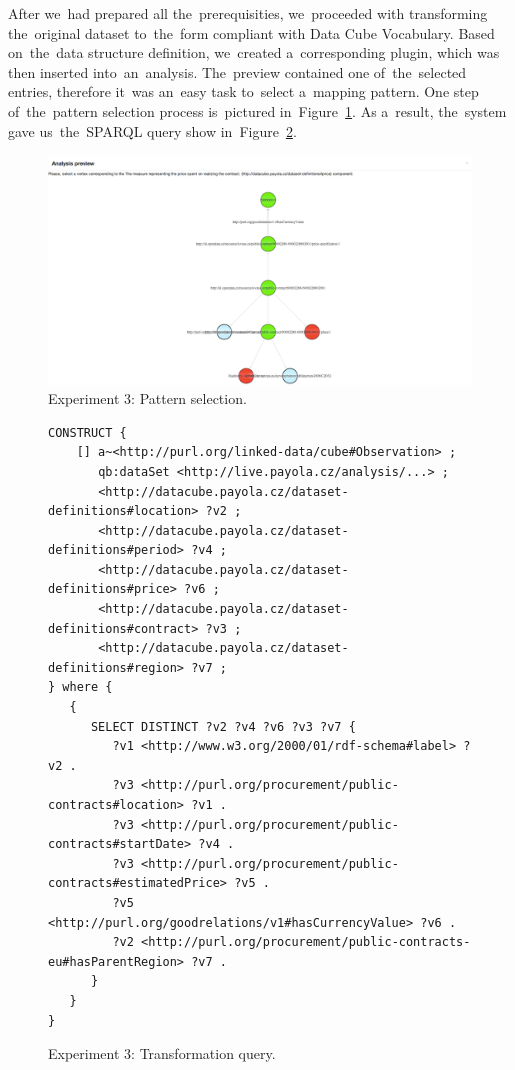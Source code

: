 After we~had prepared all the~prerequisities, we~proceeded with transforming the~original dataset to~the~form compliant with Data Cube Vocabulary. Based on~the~data structure definition, we~created a~corresponding plugin, which was then 
inserted into~an~analysis. The~preview contained one of~the~selected entries, 
therefore it~was an~easy task to~select a~mapping pattern. One step of~the~pattern selection process is~pictured in~Figure~\ref{fig:contracts-pattern}.
As a~result, the~system gave us~the~SPARQL query show in~Figure~\ref{fig:contracts-query-pattern}.

\begin{figure}
  \centering
  \includegraphics[width=140mm]{img/contracts-pattern.png}
  \caption{Experiment 3: Pattern selection.}
  \label{fig:contracts-pattern}
\end{figure}

\begin{figure}
  \scriptsize
  \begin{verbatim}
CONSTRUCT {
    [] a~<http://purl.org/linked-data/cube#Observation> ;
       qb:dataSet <http://live.payola.cz/analysis/...> ;
       <http://datacube.payola.cz/dataset-definitions#location> ?v2 ;
       <http://datacube.payola.cz/dataset-definitions#period> ?v4 ;
       <http://datacube.payola.cz/dataset-definitions#price> ?v6 ;
       <http://datacube.payola.cz/dataset-definitions#contract> ?v3 ;
       <http://datacube.payola.cz/dataset-definitions#region> ?v7 ;
} where {
   {
      SELECT DISTINCT ?v2 ?v4 ?v6 ?v3 ?v7 {
         ?v1 <http://www.w3.org/2000/01/rdf-schema#label> ?v2 .
         ?v3 <http://purl.org/procurement/public-contracts#location> ?v1 .
         ?v3 <http://purl.org/procurement/public-contracts#startDate> ?v4 .
         ?v3 <http://purl.org/procurement/public-contracts#estimatedPrice> ?v5 .
         ?v5 <http://purl.org/goodrelations/v1#hasCurrencyValue> ?v6 .
         ?v2 <http://purl.org/procurement/public-contracts-eu#hasParentRegion> ?v7 .
      }
   }
} 
  \end{verbatim}
  \caption{Experiment 3: Transformation query.}
  \label{fig:contracts-query-pattern}
\end{figure}

